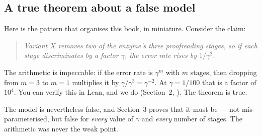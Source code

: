 \subsection{A true theorem about a false model}

Here is the pattern that organises this book, in miniature. Consider the claim:

\begin{quote}
\emph{Variant $X$ removes two of the enzyme's three proofreading stages, so if
each stage discriminates by a factor $\gamma$, the error rate rises by $1/\gamma^2$.}
\end{quote}

The arithmetic is impeccable: if the error rate is $\gamma^m$ with $m$ stages,
then dropping from $m=3$ to $m=1$ multiplies it by $\gamma/\gamma^3 = \gamma^{-2}$.
At $\gamma = 1/100$ that is a factor of $10^4$. You can verify this in Lean, and
we do (Section~2, ). The theorem is true.

The model is nevertheless false, and Section~3 proves that it must be --- not
mis-parameterised, but false for \emph{every} value of $\gamma$ and \emph{every}
number of stages. The arithmetic was never the weak point.

